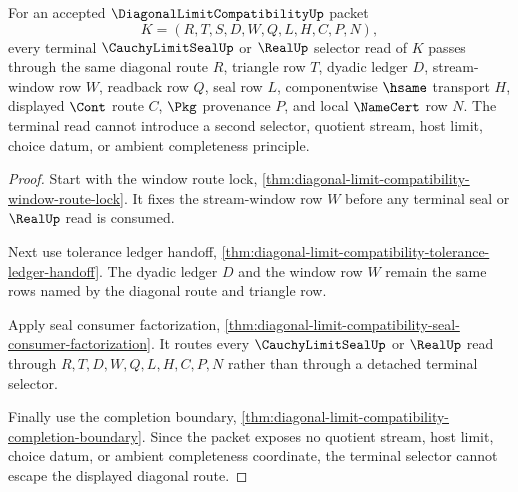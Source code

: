 \begin{theorem}
\label{thm:diagonal-limit-compatibility-terminal-selector-nonescape}
For an accepted $\DiagonalLimitCompatibilityUp$ packet
$$
K=(R,T,S,D,W,Q,L,H,C,P,N),
$$
every terminal $\CauchyLimitSealUp$ or $\RealUp$ selector read of $K$ passes through the same diagonal route $R$, triangle row $T$, dyadic ledger $D$, stream-window row $W$, readback row $Q$, seal row $L$, componentwise $\hsame$ transport $H$, displayed $\Cont$ route $C$, $\Pkg$ provenance $P$, and local $\NameCert$ row $N$. The terminal read cannot introduce a second selector, quotient stream, host limit, choice datum, or ambient completeness principle.
\end{theorem}
\begin{proof}
Start with the window route lock, \autoref{thm:diagonal-limit-compatibility-window-route-lock}. It fixes the stream-window row $W$ before any terminal seal or $\RealUp$ read is consumed.

Next use tolerance ledger handoff, \autoref{thm:diagonal-limit-compatibility-tolerance-ledger-handoff}. The dyadic ledger $D$ and the window row $W$ remain the same rows named by the diagonal route and triangle row.

Apply seal consumer factorization, \autoref{thm:diagonal-limit-compatibility-seal-consumer-factorization}. It routes every $\CauchyLimitSealUp$ or $\RealUp$ read through $R,T,D,W,Q,L,H,C,P,N$ rather than through a detached terminal selector.

Finally use the completion boundary, \autoref{thm:diagonal-limit-compatibility-completion-boundary}. Since the packet exposes no quotient stream, host limit, choice datum, or ambient completeness coordinate, the terminal selector cannot escape the displayed diagonal route.
\end{proof}


